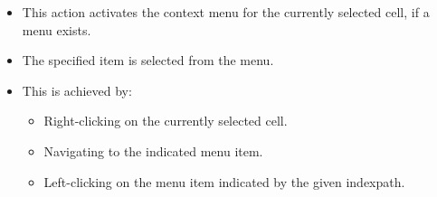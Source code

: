  \begin{itemize}
\item This action activates the context menu for the currently selected cell, if a menu exists.
\item The specified item is  selected from the menu.
\item This is achieved by:
  \begin{itemize}
    \item Right-clicking on the currently selected cell.
    \item Navigating to the indicated menu item.
    \item Left-clicking on the menu item indicated by the given indexpath.
  \end{itemize}

\end{itemize} 

